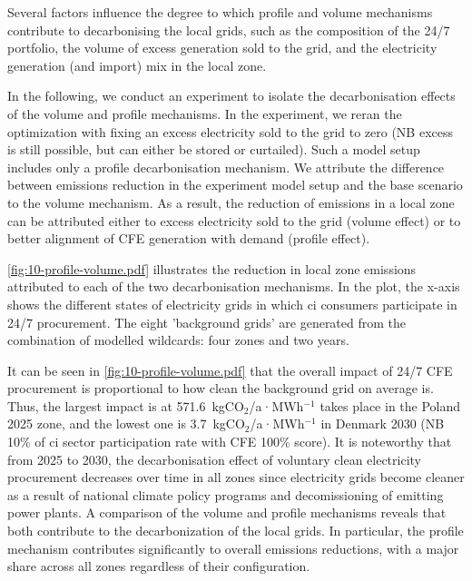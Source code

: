 Several factors influence the degree to which profile and volume mechanisms contribute to decarbonising the local grids, such as the composition of the 24/7 portfolio, the volume of excess generation sold to the grid, and the electricity generation (and import) mix in the local zone.

In the following, we conduct an experiment to isolate the decarbonisation effects of the volume and profile mechanisms.
In the experiment, we reran the optimization with fixing an excess electricity sold to the grid to zero (NB excess is still possible, but can either be stored or curtailed). 
Such a model setup includes only a profile decarbonisation mechanism. 
We attribute the difference between emissions reduction in the experiment model setup and the base scenario to the volume mechanism.
As a result, the reduction of \co emissions in a local zone can be attributed either to excess electricity sold to the grid (volume effect) or to better alignment of CFE generation with demand (profile effect).

\cref{fig:10-profile-volume.pdf} illustrates the reduction in local zone emissions attributed to each of the two decarbonisation mechanisms.
In the plot, the x-axis shows the different states of electricity grids in which \gls{ci} consumers participate in 24/7 procurement.
The eight 'background grids' are generated from the combination of modelled wildcards: four zones and two years.

It can be seen in \cref{fig:10-profile-volume.pdf} that the overall impact of 24/7 CFE procurement is proportional to how clean the background grid on average is.
Thus, the largest impact is at 571.6~kgCO$_2$/a·MWh$^{-1}$ takes place in the Poland 2025 zone, and the lowest one is 3.7~kgCO$_2$/a·MWh$^{-1}$ in Denmark 2030 (NB 10\% of \gls{ci} sector participation rate with CFE 100\% score).
It is noteworthy that from 2025 to 2030, the decarbonisation effect of voluntary clean electricity procurement decreases over time in all zones since electricity grids become cleaner as a result of national climate policy programs and decomissioning of emitting power plants.
A comparison of the volume and profile mechanisms reveals that both contribute to the decarbonization of the local grids.
In particular, the profile mechanism contributes significantly to overall emissions reductions, with a major share across all zones regardless of their configuration.

